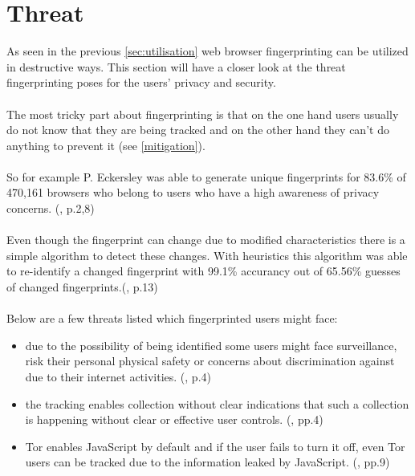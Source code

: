 \section{Threat}
As seen in the previous \autoref{sec:utilisation} web browser fingerprinting can be utilized in destructive ways. This section will have a closer look at the threat fingerprinting poses for the users' privacy and security.\\\\
The most tricky part about fingerprinting is that on the one hand users usually do not know that they are being tracked and on the other hand they can't do anything to prevent it (see \autoref{mitigation}). \\\\
So for example P. Eckersley was able to generate unique fingerprints for 83.6\% of 470,161 browsers who belong to users who have a high awareness of privacy concerns. (\textcite{eckersley10}, p.2,8)\\\\
Even though the fingerprint can change due to modified characteristics there is a simple algorithm to detect these changes. With heuristics this algorithm was able to re-identify a changed fingerprint with 99.1\% accurancy out of 65.56\% guesses of changed fingerprints.(\textcite{eckersley10}, p.13)\\\\
Below are a few threats listed which fingerprinted users might face:
\begin{itemize}
	\item due to the possibility of being identified some users might face surveillance, risk their personal physical safety or concerns about discrimination against due to their internet activities. (\textcite{doty18}, p.4)
	\item the tracking enables collection without clear indications that such a collection is happening without clear or effective user controls. (\textcite{doty18}, pp.4)
	\item Tor enables JavaScript by default and if the user fails to turn it off, even Tor users can be tracked due to the information leaked by JavaScript. (\textcite{havens16}, pp.9)
\end{itemize}

